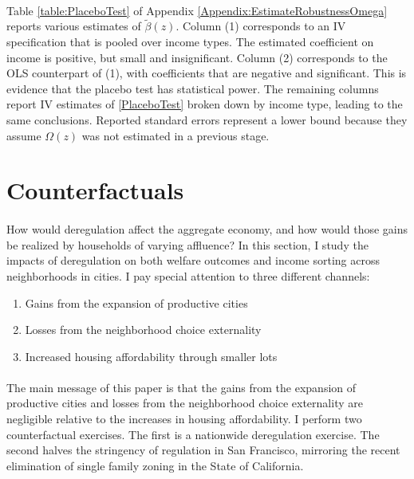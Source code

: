 \documentclass[12pt]{article}
\begin{document}
\paragraph*{}
Table \ref{table:PlaceboTest} of Appendix \ref{Appendix:EstimateRobustnessOmega} reports various estimates of $\tilde{\beta}(z)$. Column (1) corresponds to an IV specification that is pooled over income types. The estimated coefficient on income is positive, but small and insignificant. Column (2) corresponds to the OLS counterpart of (1), with coefficients that are negative and significant. This is evidence that the placebo test has statistical power. The remaining columns report IV estimates of \eqref{PlaceboTest} broken down by income type, leading to the same conclusions. Reported standard errors represent a lower bound because they assume $\Omega(z)$ was not estimated in a previous stage. 



\section{Counterfactuals}\label{Section:Counterfactuals}
\paragraph{}
How would deregulation affect the aggregate economy, and how would those gains be realized by households of varying affluence? In this section, I study the impacts of deregulation on both welfare outcomes and income sorting across neighborhoods in cities. I pay special attention to three different channels:

\begin{enumerate}
	\item Gains from the expansion of productive cities \citep{hseihmoretti, durantonpugaurbgrowth}
	
	\item Losses from the neighborhood choice externality \citep{hamilton1976, calabresetal}
	
	\item Increased housing affordability through smaller lots \citep{Song, kulka}
\end{enumerate}

\paragraph*{}
The main message of this paper is that the gains from the expansion of productive cities and losses from the neighborhood choice externality are negligible relative to the increases in housing affordability. I perform two counterfactual exercises. The first is a nationwide deregulation exercise. The second halves the stringency of regulation in San Francisco, mirroring the recent elimination of single family zoning in the State of California. 
\end{document}
